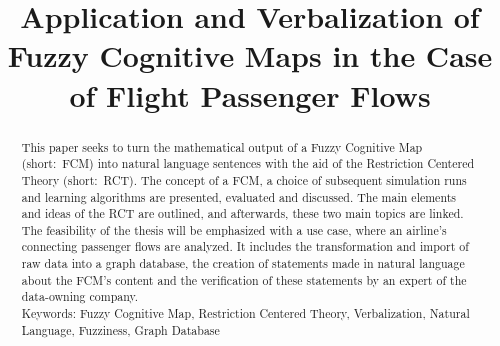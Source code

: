 \documentclass[conference]{IEEEtran}
\begin{document}
\title{Application and Verbalization of Fuzzy Cognitive Maps in the Case of Flight Passenger Flows}

\author{
\and
{}
\and
{}
}

\maketitle

\begin{abstract}
This paper seeks to turn the mathematical output of a Fuzzy Cognitive Map (short:~FCM) into natural language sentences with the aid of the Restriction Centered Theory (short:~RCT). The concept of a FCM, a choice of subsequent simulation runs and learning algorithms are presented, evaluated and discussed. The main elements and ideas of the RCT are outlined, and afterwards, these two main topics are linked.\\
The feasibility of the thesis will be emphasized with a use case, where an airline's connecting passenger flows are analyzed. It includes the transformation and import of raw data into a graph database, the creation of statements made in natural language about the FCM's content and the verification of these statements by an expert of the data-owning company.\\
Keywords: Fuzzy Cognitive Map, Restriction Centered Theory, Verbalization, Natural Language, Fuzziness, Graph Database
\end{abstract}

\IEEEpeerreviewmaketitle
\end{document}
